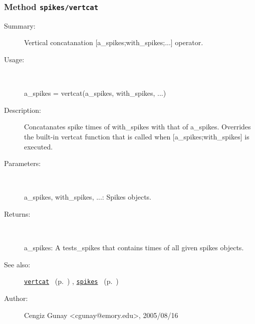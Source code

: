 \subsubsection[Method \texttt{vertcat}]{Method \texttt{spikes/vertcat}}%
%
\label{ref_spikes__vertcat}%
\hypertarget{ref_spikes__vertcat}{}%
\begin{description}
\item[Summary:]Vertical concatanation [a\_spikes;with\_spikes;...] operator.
%
\item[Usage:]~%
\begin{lyxcode}%
a\_spikes = vertcat(a\_spikes, with\_spikes, ...)
%
\end{lyxcode}%
%
\item[Description:]%
Concatanates spike times of with\_spikes with that of a\_spikes. Overrides the built-in
 vertcat function that is called when [a\_spikes;with\_spikes] is executed.
\item[Parameters:]~

a\_spikes, with\_spikes, ...: Spikes objects.%
\item[Returns:]~

	a\_spikes: A tests\_spikes that contains times of all given spikes objects.
%
%
\item[See also:]%
\hyperlink{ref_vertcat}{\texttt{vertcat}}%
\ (p.~\pageref{ref_vertcat})%
%
, \hyperlink{ref_spikes}{\texttt{spikes}}%
\ (p.~\pageref{ref_spikes})%
%
%
\item[Author:]%
Cengiz Gunay <cgunay@emory.edu>, 2005/08/16%
\end{description}
\methodline%
